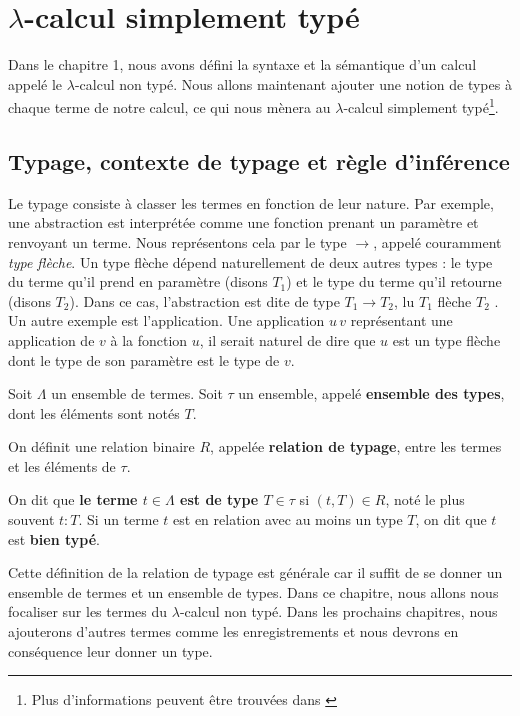 \chapter{$\lambda$-calcul simplement typé}

Dans le chapitre 1, nous avons défini la syntaxe et la sémantique d'un calcul
appelé le $\lambda$-calcul non typé. Nous allons maintenant ajouter une notion de types à
chaque terme de notre calcul, ce qui nous mènera au $\lambda$-calcul simplement
typé\footnote{Plus d'informations peuvent être trouvées dans \cite{tapl-simply-typed-lambda-calculus}}.

\section{Typage, contexte de typage et règle d'inférence}

Le typage consiste à classer les termes en fonction de leur nature. Par exemple,
une abstraction est interprétée comme une fonction prenant un paramètre et
renvoyant un terme. Nous représentons cela par le type $\rightarrow$, appelé
couramment \textit{type flèche}. Un type flèche dépend naturellement de deux autres types : le
type du terme qu'il prend en paramètre (disons $T_{1}$) et le type du terme
qu'il retourne (disons $T_{2}$). Dans ce cas, l'abstraction est dite de type
$T_{1} \rightarrow T_{2}$, lu \og $T_{1}$ flèche $T_{2}$ \fg. Un
autre exemple est l'application. Une application $u \, v$ représentant une
application de $v$ à la fonction $u$, il serait naturel de dire que $u$ est un
type flèche dont le type de son paramètre est le type de $v$.

\begin{definition} 
  \label{def:simply-typed-lambda-calculus-type-relation}
  Soit $\Lambda$ un ensemble de termes.
  Soit $\tau$ un ensemble, appelé \textbf{ensemble des types}, dont les éléments
  sont notés $T$.

  On définit une relation binaire $R$, appelée \textbf{relation de typage}, entre les
  termes et les éléments de $\tau$.
  
  On dit que \textbf{le terme $t \in \Lambda$ est de type $T \in \tau$} si $(t, T)
  \in R$, noté le plus souvent $t : T$. Si un terme $t$ est en relation avec au
  moins un type $T$, on dit que $t$ est \textbf{bien typé}.
\end{definition}

Cette définition de la relation de typage est générale car il suffit de se
donner un ensemble de termes et un ensemble de types. Dans ce chapitre, nous
allons nous focaliser sur les termes du $\lambda$-calcul non typé. Dans les
prochains chapitres, nous ajouterons d'autres termes comme les enregistrements
et nous devrons en conséquence leur donner un type.

